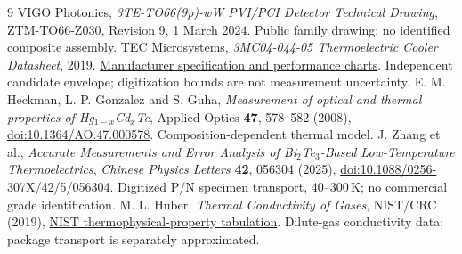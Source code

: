 \documentclass[11pt,a4paper]{article}
\begin{document}
\clearpage
{}
{}
\begin{thebibliography}{9}
 VIGO Photonics, \emph{3TE-TO66(9p)-wW PVI/PCI Detector Technical Drawing}, ZTM-TO66-Z030, Revision 9, 1 March 2024. Public family drawing; no identified composite assembly.
 TEC Microsystems, \emph{3MC04-044-05 Thermoelectric Cooler Datasheet}, 2019. \href{https://www.tec-microsystems.com/Download/Datasheets/Thermoelectric\%20Coolers/MC04\%20Series/3MC04-044-05_Datasheet_2019.pdf}{Manufacturer specification and performance charts}. Independent candidate envelope; digitization bounds are not measurement uncertainty.
 E. M. Heckman, L. P. Gonzalez and S. Guha, \emph{Measurement of optical and thermal properties of Hg$_{1-x}$Cd$_x$Te}, Applied Optics \textbf{47}, 578--582 (2008), \href{https://doi.org/10.1364/AO.47.000578}{doi:10.1364/AO.47.000578}. Composition-dependent thermal model.
 J. Zhang et al., \emph{Accurate Measurements and Error Analysis of Bi$_2$Te$_3$-Based Low-Temperature Thermoelectrics}, \emph{Chinese Physics Letters} \textbf{42}, 056304 (2025), \href{https://doi.org/10.1088/0256-307X/42/5/056304}{doi:10.1088/0256-307X/42/5/056304}. Digitized P/N specimen transport, 40--300\,K; no commercial grade identification.
 M. L. Huber, \emph{Thermal Conductivity of Gases}, NIST/CRC (2019), \href{https://tsapps.nist.gov/publication/get_pdf.cfm?pub_id=926438}{NIST thermophysical-property tabulation}. Dilute-gas conductivity data; package transport is separately approximated.
\end{thebibliography}
\end{document}

